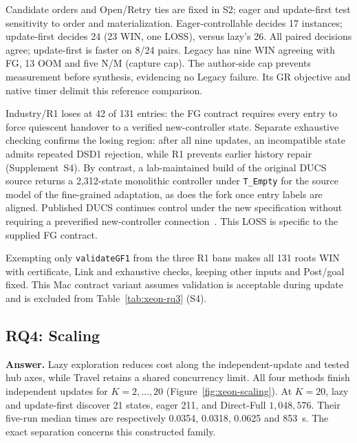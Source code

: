 \documentclass[acmsmall,screen,review,anonymous]{acmart}
\begin{document}
Candidate orders and Open/Retry ties are fixed in S2; eager and update-first test sensitivity to order and materialization. Eager-controllable decides 17 instances; update-first decides 24 (23 WIN, one LOSS), versus lazy's 26. All paired decisions agree; update-first is faster on 8/24 pairs. Legacy has nine WIN agreeing with FG, 13 OOM and five N/M (capture cap). The author-side cap prevents measurement before synthesis, evidencing no Legacy failure. Its GR objective and native timer delimit this reference comparison.

Industry/R1 loses at 42 of 131 entries: the FG contract requires every entry to force quiescent handover to a verified new-controller state. Separate exhaustive checking confirms the losing region: after all nine updates, an incompatible state admits repeated DSD1 rejection, while R1 prevents earlier history repair (Supplement~S4). By contrast, a lab-maintained build of the original DUCS source returns a 2,312-state monolithic controller under \texttt{T\_Empty} for the source model of the fine-grained adaptation, as does the fork once entry labels are aligned. Published DUCS continues control under the new specification without requiring a preverified new-controller connection~\cite[Defs.~4.1--4.3]{Nahabedian2020}. This LOSS is specific to the supplied FG contract.

Exempting only \texttt{validateGF1} from the three R1 bans makes all 131 roots WIN with certificate, Link and exhaustive checks, keeping other inputs and Post/goal fixed. This Mac contract variant assumes validation is acceptable during update and is excluded from Table~\ref{tab:xeon-rq3} (S4).

\begin{table}[!htbp]
\caption{RQ3 solver time (seconds), all 27 instances and five methods. Medians require five valid, consistent completions; other cells retain statuses. PC Arms=1 is the DUCS Production Cell benchmark; Arms=2 is its extension included in the 27 instances since the ICSE draft. Ranges and full metrics: Supplement~S4.}
\label{tab:xeon-rq3}
\centering

\end{table}

\subsection{RQ4: Scaling}
\textbf{Answer.} Lazy exploration reduces cost along the independent-update and tested hub axes, while Travel retains a shared concurrency limit. All four methods finish independent updates for $K=2,\ldots,20$ (Figure~\ref{fig:xeon-scaling}). At $K=20$, lazy and update-first discover 21 states, eager 211, and Direct-Full $1{,}048{,}576$. Their five-run median times are respectively 0.0354, 0.0318, 0.0625 and 853~s. The exact separation concerns this constructed family.
\end{document}
